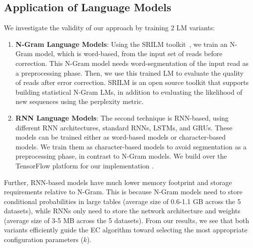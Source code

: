 \subsection{Application of Language Models}
We investigate the validity of our approach by training 2 LM variants: 
\begin{enumerate}
\item \textbf{N-Gram Language Models}: Using the SRILM toolkit~\cite{Stolcke02srilm--}, we train an N-Gram model, which is word-based, from the input set of reads before correction. This N-Gram model needs word-segmentation of the input read as a preprocessing phase. Then, we use this trained LM to evaluate the quality of reads after error correction. SRILM is an open source toolkit that supports building statistical N-Gram LMs, in addition to evaluating the likelihood of new sequences using the perplexity metric. 

\item \textbf{RNN Language Models}: The second technique is RNN-based, using different RNN architectures, \eg standard RNNs, LSTMs, and GRUs.
These models can be trained either as word-based models or character-based models. We train them as character-based models to avoid segmentation as a preprocessing phase, in contrast to N-Gram models. We build over the TensorFlow platform for our implementation \cite{45381}.
\end{enumerate}

Further, RNN-based models have much lower memory footprint and storage requirements relative to N-Gram. This is because N-Gram models need to store conditional probabilities in large tables (average size of 0.6-1.1 GB across the 5 datasets), while RNNs only need to store the network architecture and  weights (average size of 3-5 MB across the 5 datasets). 
From our results, we see that both \name variants efficiently guide the EC algorithm toward selecting the most appropriate configuration parameters (\eg $k$). 

